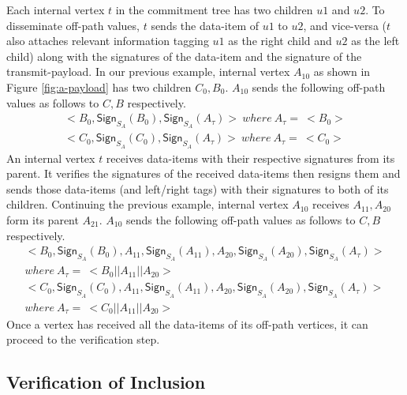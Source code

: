 		Each internal vertex $t$ in the commitment tree has two children $u1$ and $u2$. 
		To disseminate off-path values, $t$ sends the data-item of $u1$ to $u2$, and vice-versa ($t$ also attaches relevant information tagging $u1$ as the right child and $u2$ as the left child) along with the signatures of the data-item and the signature of the transmit-payload.
		In our previous example, internal vertex $A_{10}$ as shown in Figure \ref{fig:a-payload} has two children $C_{0},B_{0}$.
		$A_{10}$ sends the following off-path values as follows to $C, B$ respectively.
		\begin{equation}
			\begin{array}{l}
			<B_{0}, \textsf{Sign}_{S_{A}}(B_{0}),\textsf{Sign}_{S_{A}}(A_{\tau})>\ where\ A_{\tau} =\ <B_{0}>\\
			<C_{0}, \textsf{Sign}_{S_{A}}(C_{0}),\textsf{Sign}_{S_{A}}(A_{\tau})>\ where\ A_{\tau} =\ <C_{0}>
			\end{array}
		\end{equation}
		An internal vertex $t$ receives data-items with their respective signatures from its parent. 
		It verifies the signatures of the received data-items then resigns them and sends those data-items (and left/right tags) with their signatures to both of its children.
		Continuing the previous example, internal vertex $A_{10}$ receives $A_{11}, A_{20}$ form its parent $A_{21}$.
		$A_{10}$ sends the following off-path values as follows to $C, B$ respectively.
		\begin{equation}
			\begin{array}{l}
			<B_{0}, \textsf{Sign}_{S_{A}}(B_{0}),A_{11},\textsf{Sign}_{S_{A}}(A_{11}),A_{20},\textsf{Sign}_{S_{A}}(A_{20}),\textsf{Sign}_{S_{A}}(A_{\tau})>\\ 
				where\  A_{\tau} =\ <B_{0}||A_{11}||A_{20}>\\
			<C_{0}, \textsf{Sign}_{S_{A}}(C_{0}),A_{11},\textsf{Sign}_{S_{A}}(A_{11}),A_{20},\textsf{Sign}_{S_{A}}(A_{20}),\textsf{Sign}_{S_{A}}(A_{\tau})>\\ 
				where\  A_{\tau} =\ <C_{0}||A_{11}||A_{20}>
			\end{array}
		\end{equation}
		Once a vertex has received all the data-items of its off-path vertices, it can proceed to the verification step.
	
	\subsection{Verification of Inclusion}
	

